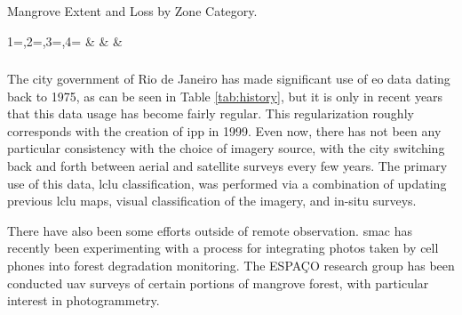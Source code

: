 \begin{table}[!htb]\centering
	\caption[Mangrove Extent and Loss by Zone Category]{Mangrove Extent and Loss by Zone Category.} \label{tab:loss_area_zone}
	\fontsize{8}{10}\selectfont
		{1=\year,2=\type,3=\platform,4=\agency}
		{\textbf{\year} & \type & \platform & \agency}
\end{table}



%


\subsubsection{} 

The city government of Rio de Janeiro has made significant use of \ac{eo} data dating back to 1975, as can be seen in Table \ref{tab:history}, but it is only in recent years that this data usage has become fairly regular. This regularization roughly corresponds with the creation of \ac{ipp} in 1999. Even now, there has not been any particular consistency with the choice of imagery source, with the city switching back and forth between aerial and satellite surveys every few years. The primary use of this data, \acf{lclu} classification, was performed via a combination of updating previous \ac{lclu} maps, visual classification of the imagery, and in-situ surveys.

There have also been some efforts outside of remote observation. \ac{smac} has recently been experimenting with a process for integrating photos taken by cell phones into forest degradation monitoring. The ESPAÇO research group has been conducted \ac{uav} surveys of certain portions of mangrove forest, with particular interest in photogrammetry. 

